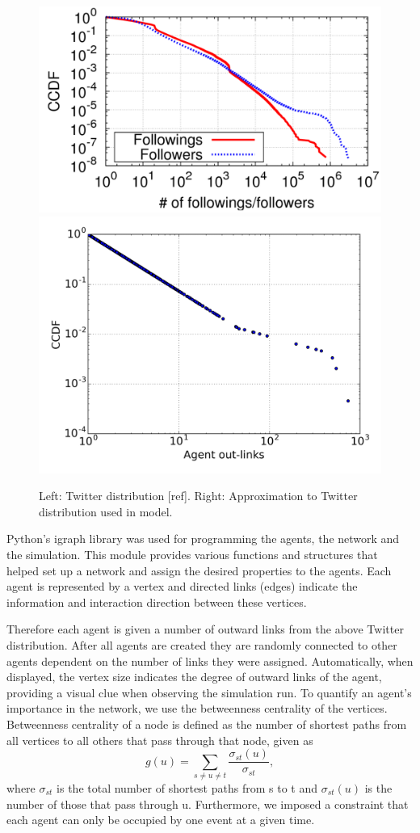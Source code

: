 \documentclass [12pt,a4paper,twoside]{article}
\begin{document}
\begin{figure}[h!]
  \centering
  \includegraphics[width=0.45\linewidth]{report/Twitter_real_distr}
  \includegraphics[width=0.54\linewidth]{report/Out-link_Distribution2}
  \caption{Left: Twitter distribution [ref]. Right: Approximation to Twitter distribution used in model.}
  \label{twitter_distr}
\end{figure}

Python's igraph library was used for programming the agents, the network and the simulation. This module provides various functions and structures that helped set up a network and assign the desired properties to the agents. Each agent is represented by a vertex and directed links (edges) indicate the information and interaction direction between these vertices.

Therefore each agent is given a number of outward links from the above Twitter distribution. After all agents are created they are randomly connected to other agents dependent on the number of links they were assigned. Automatically, when displayed, the vertex size indicates the degree of outward links of the agent, providing a visual clue when observing the simulation run. To quantify an agent's importance in the network, we use the betweenness centrality of the vertices. Betweenness centrality of a node is defined as the number of shortest paths from all vertices to all others that pass through that node, given as
\begin{equation}
g(u) = \sum_{s\neq u\neq t} \frac{\sigma_{st}(u)}{\sigma_{st}},
\end{equation}
where $\sigma_{st}$ is the total number of shortest paths from s to t and $\sigma_{st}(u)$ is the number of those that pass through u. Furthermore, we imposed a constraint that each agent can only be occupied by one event at a given time.
\end{document}
